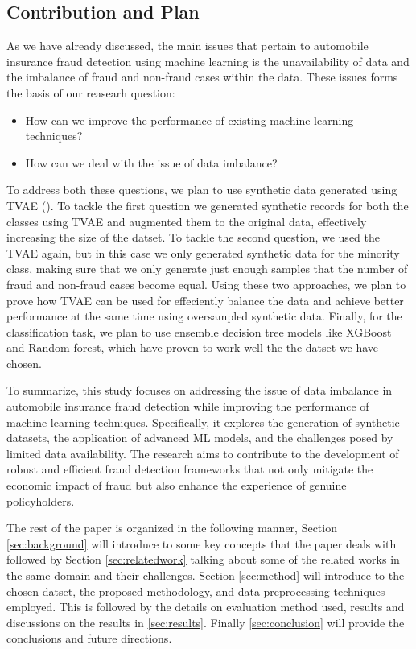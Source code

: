\documentclass[twoside,11pt]{article}
\begin{document}
\subsection{Contribution and Plan}

As we have already discussed, the main issues that pertain to automobile insurance fraud detection using machine learning is the unavailability of data and the imbalance of fraud and non-fraud cases within the data. These issues forms the basis of our reasearh question:

\begin{itemize}
    \item How can we improve the performance of existing machine learning techniques?
    \item How can we deal with the issue of data imbalance?
\end{itemize}

To address both these questions, we plan to use synthetic data generated using TVAE (\citealp{XuRp}). To tackle the first question we generated synthetic records for both the classes using TVAE and augmented them to the original data, effectively increasing the size of the datset. To tackle the second question, we used the TVAE again, but in this case we only generated synthetic data for the minority class, making sure that we only generate just enough samples that the number of fraud and non-fraud cases become equal. Using these two approaches, we plan to prove how TVAE can be used for effeciently balance the data and achieve better performance at the same time using oversampled synthetic data. Finally, for the classification task, we plan to use ensemble decision tree models like XGBoost and Random forest, which have proven to work well the the datset we have chosen.

To summarize, this study focuses on addressing the issue of data imbalance in automobile insurance fraud detection while improving the performance of machine learning techniques. Specifically, it explores the generation of synthetic datasets, the application of advanced ML models, and the challenges posed by limited data availability. The research aims to contribute to the development of robust and efficient fraud detection frameworks that not only mitigate the economic impact of fraud but also enhance the experience of genuine policyholders.

The rest of the paper is organized in the following manner, Section \ref{sec:background} will introduce to some key concepts that the paper deals with followed by Section \ref{sec:relatedwork} talking about some of the related works in the same domain and their challenges. Section \ref{sec:method} will introduce to the chosen datset, the proposed methodology, and data preprocessing techniques employed. This is followed by the details on evaluation method used, results and discussions on the results in \ref{sec:results}. Finally \ref{sec:conclusion} will provide the conclusions and future directions.
\end{document}
